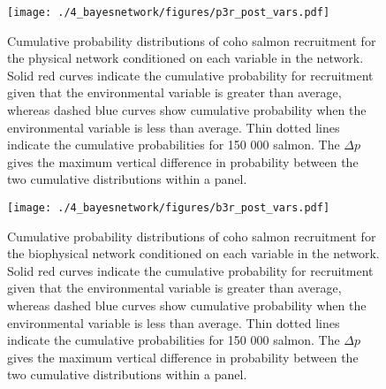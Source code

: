 \begin{figure}[htbp]
  \centering \texttt{[image: ./4\_bayesnetwork/figures/p3r\_post\_vars.pdf]}
  \caption[Cumulative probability distributions of coho salmon recruitment for
           the physical network conditioned on each variable in the
           network.]{Cumulative probability distributions of coho salmon
           recruitment for the physical network conditioned on each variable in
           the network. Solid red curves indicate the cumulative probability
           for recruitment given that the environmental variable is greater than
           average, whereas dashed blue curves show cumulative probability when
           the environmental variable is less than average. Thin dotted lines
           indicate the cumulative probabilities for 150 000 salmon. The
           \(\Delta p\) gives the maximum vertical difference in probability
           between the two cumulative distributions within a panel.}
  \label{fig:bn:6}
\end{figure}

\begin{figure}[htbp]
  \centering \texttt{[image: ./4\_bayesnetwork/figures/b3r\_post\_vars.pdf]}
  \caption[Cumulative probability distributions of coho salmon recruitment for
           the biophysical network conditioned on each variable in the
           network.]{Cumulative probability distributions of coho salmon
           recruitment for the biophysical network conditioned on each variable
           in the network. Solid red curves indicate the cumulative probability
           for recruitment given that the environmental variable is greater than
           average, whereas dashed blue curves show cumulative probability when
           the environmental variable is less than average. Thin dotted lines
           indicate the cumulative probabilities for 150 000 salmon. The
           \(\Delta p\) gives the maximum vertical difference in probability
           between the two cumulative distributions within a panel.}
  \label{fig:bn:7}
\end{figure}


